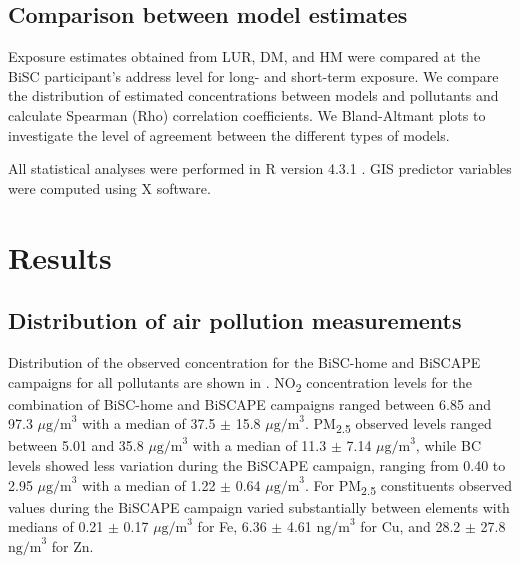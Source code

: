 \documentclass{article}
\begin{document}
\subsection{Comparison between model estimates}
Exposure estimates obtained from LUR, DM, and HM were compared at the BiSC participant's address level for long- and short-term exposure. We compare the distribution of estimated concentrations between models and pollutants and calculate Spearman (Rho) correlation coefficients. We Bland-Altmant plots to investigate the level of agreement between the different types of models.  

All statistical analyses were performed in R version 4.3.1 \cite{Rstudio}. GIS predictor variables were computed using X software. 

\section{Results}

\subsection{Distribution of air pollution measurements}

Distribution of the observed concentration for the BiSC-home and BiSCAPE campaigns for all pollutants are shown in . NO\textsubscript{2} concentration levels for the combination of BiSC-home and BiSCAPE campaigns ranged between 6.85 and 97.3 \(\mu \text{g/m}^3\) with a median of  37.5 \(\pm\) 15.8 \( \mu \text{g/m}^3\). PM\textsubscript{2.5} observed levels ranged between 5.01 and 35.8 \( \mu \text{g/m}^3\) with a median of 11.3 \(\pm\) 7.14 \(\mu \text{g/m}^3\), while BC levels showed less variation during the BiSCAPE campaign, ranging from 0.40 to 2.95 \(  \mu \text{g/m}^3\) with a median of 1.22 \(\pm\) 0.64 \( \mu \text{g/m}^3\). For PM\textsubscript{2.5} constituents  observed values during the BiSCAPE campaign varied substantially between elements with medians of 0.21 \(\pm\) 0.17 \(  \mu \text{g/m}^3\)  for  Fe,  6.36 \(\pm\) 4.61 \( \text{ng/m}^3 \) for Cu, and 28.2 \(\pm\) 27.8 \( \text{ng/m}^3 \) for Zn. 
\end{document}
